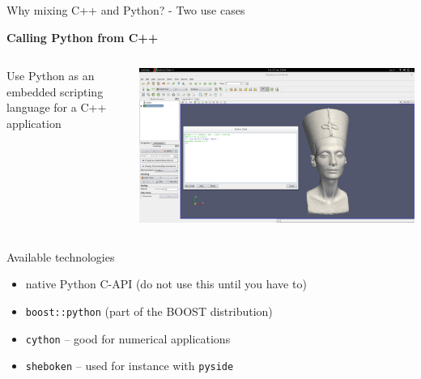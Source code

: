\begin{frame}[fragile]{Why mixing C++ and Python? - Two use cases}
    \vspace{0.05\textheight}
    \begin{center}
        \textbf{Calling Python from C++}
    \end{center}
    \begin{columns}[c]
        \begin{column}{0.49\linewidth}
            Use Python as an embedded scripting language for a 
            C++ application
        \end{column}
        \hfill
        \begin{column}{0.4\linewidth}
            \includegraphics[width=\linewidth]{pics/paraview.png}
        \end{column}
    \end{columns}
    

\end{frame}

\begin{frame}[fragile]{Available technologies}
    
    \begin{itemize}
        \setlength{\itemsep}{0.075\textheight}
        \item native Python C-API (do not use this until you have to)
        \item \texttt{boost::python} (part of the BOOST distribution)
        \item \texttt{cython} -- good for numerical applications
        \item \texttt{sheboken} -- used for instance with \texttt{pyside}
    \end{itemize}
\end{frame}

